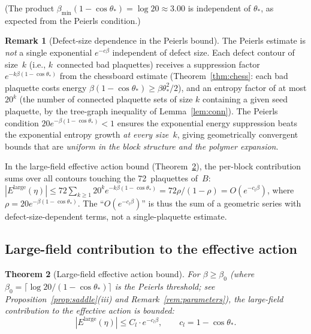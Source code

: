 \documentclass[11pt]{article}
\newtheorem{theorem}{Theorem}[section]
\theoremstyle{definition}
\newtheorem{remark}[theorem]{Remark}
\begin{document}
\noindent (The product $\beta_{\min}(1-\cos\theta_*)=\log 20\approx 3.00$
is independent of $\theta_*$, as expected from the Peierls condition.)

\begin{remark}[Defect-size dependence in the Peierls bound]%
\label{rem:peierls-size}
The Peierls estimate is \emph{not} a single exponential $e^{-c\beta}$
independent of defect size.  Each defect contour of size~$k$ (i.e.,
$k$~connected bad plaquettes) receives a suppression factor
$e^{-k\beta(1-\cos\theta_*)}$ from the chessboard estimate
(Theorem~\ref{thm:chess}: each bad plaquette costs energy
$\beta(1-\cos\theta_*)\ge\beta\theta_*^2/2$), and an entropy factor
of at most $20^k$ (the number of connected plaquette sets of size $k$
containing a given seed plaquette, by the tree-graph inequality of
Lemma~\ref{lem:conn}).  The Peierls condition
$20e^{-\beta(1-\cos\theta_*)}<1$ ensures the exponential energy
suppression beats the exponential entropy growth \emph{at every
size~$k$}, giving geometrically convergent bounds that are
\emph{uniform in the block structure and the polymer expansion}.

In the large-field effective action bound
(Theorem~\ref{thm:largefield}), the per-block contribution sums
over all contours touching the 72~plaquettes of~$B$:
$|E^{\mathrm{large}}(\eta)|\le 72\sum_{k\ge 1}20^k
e^{-k\beta(1-\cos\theta_*)}
=72\rho/(1-\rho)=O(e^{-c_l\beta})$,
where $\rho=20e^{-\beta(1-\cos\theta_*)}$.
The ``$O(e^{-c_l\beta})$'' is thus the sum of a geometric series
with defect-size-dependent terms, not a single-plaquette estimate.
\end{remark}

\subsection{Large-field contribution to the effective action}
\label{subsec:LFeff}

\begin{theorem}[Large-field effective action bound]\label{thm:largefield}
For $\beta\ge\beta_0$ (where $\beta_0=\lceil\log 20/(1-\cos\theta_*)\rceil$
is the Peierls threshold; see Proposition~\ref{prop:saddle}(iii)
and Remark~\ref{rem:parameters}), the large-field contribution to the
effective action is bounded:
\begin{equation}
|E^{\mathrm{large}}(\eta)|\le C_l\cdot e^{-c_l\beta},
\qquad c_l=1-\cos\theta_*.
\end{equation}
\end{theorem}
\end{document}
